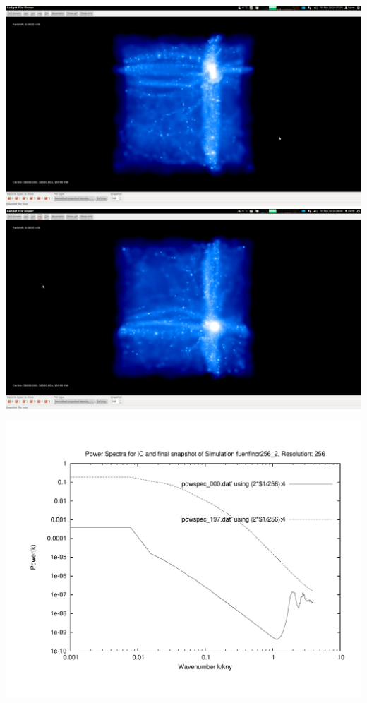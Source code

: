 \includegraphics[scale=0.12]{r256/h100/fuenfincr256_2/1.png} 
\includegraphics[scale=0.12]{r256/h100/fuenfincr256_2/2.png}

\includegraphics[scale=0.5]{r256/h100/fuenfincr256_2/plot_powspec_fuenfincr256_2}

